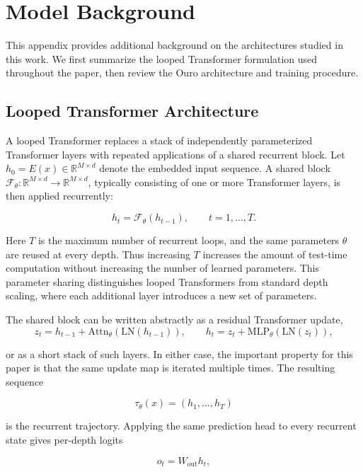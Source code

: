 \documentclass[10pt]{article} %
\begin{document}



\appendix

\section{Model Background}
This appendix provides additional background on the architectures studied in this work. We first summarize the looped Transformer formulation used throughout the paper, then review the Ouro architecture and training procedure.

\subsection{Looped Transformer Architecture}
\label{app:looped_architecture_details}

A looped Transformer replaces a stack of independently parameterized Transformer layers with repeated applications of a shared recurrent block. Let \(h_0=E(x)\in\mathbb{R}^{M\times d}\) denote the embedded input sequence. A shared block \(\mathcal{F}_\theta:\mathbb{R}^{M\times d}\rightarrow\mathbb{R}^{M\times d}\), typically consisting of one or more Transformer layers, is then applied recurrently:

\[
h_t = \mathcal{F}_\theta(h_{t-1}), \qquad t=1,\ldots,T.
\]

Here \(T\) is the maximum number of recurrent loops, and the same parameters \(\theta\) are reused at every depth. Thus increasing \(T\) increases the amount of test-time computation without increasing the number of learned parameters. This parameter sharing distinguishes looped Transformers from standard depth scaling, where each additional layer introduces a new set of parameters.

The shared block can be written abstractly as a residual Transformer update,
\[
z_t = h_{t-1} + \mathrm{Attn}_\theta(\mathrm{LN}(h_{t-1})), 
\qquad
h_t = z_t + \mathrm{MLP}_\theta(\mathrm{LN}(z_t)),
\]

or as a short stack of such layers. In either case, the important property for this paper is that the same update map is iterated multiple times. The resulting sequence

\[
\tau_\theta(x) = (h_1,\ldots,h_T)
\]

is the recurrent trajectory. Applying the same prediction head to every recurrent state gives per-depth logits

\[
o_t = W_{\mathrm{out}} h_t,
\]
\end{document}
